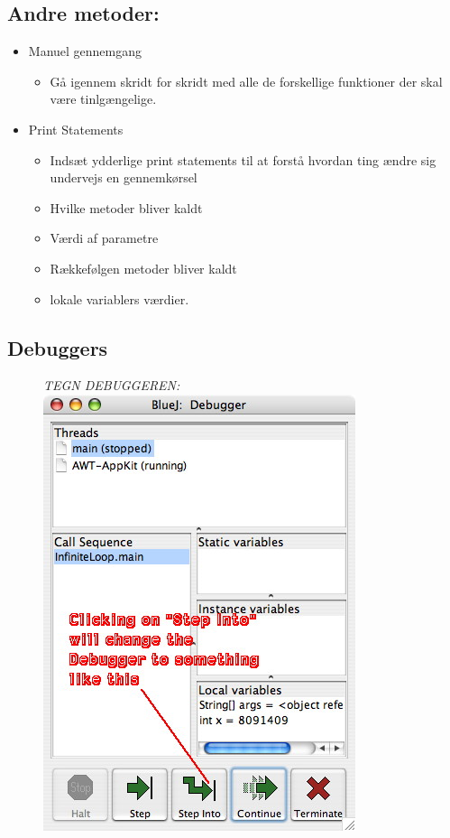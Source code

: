 \documentclass{article}
\begin{document}
\subsection*{Andre metoder:}
\begin{itemize}
    \item Manuel gennemgang
    \begin{itemize}
        \item Gå igennem skridt for skridt med alle de forskellige funktioner der skal være tinlgængelige.
    \end{itemize}
    \item Print Statements
    \begin{itemize}
        \item Indsæt ydderlige print statements til at forstå hvordan ting ændre sig undervejs en gennemkørsel
        \item Hvilke metoder bliver kaldt
        \item Værdi af parametre
        \item Rækkefølgen metoder bliver kaldt
        \item lokale variablers værdier.
    \end{itemize}
\end{itemize}

\subsection*{Debuggers}
\begin{figure}[H]
    \centering
    \textit{TEGN DEBUGGEREN:} \\
    \includegraphics[scale=0.4]{img/loopInfin_debuggerStepInto.jpg}
\end{figure}
\end{document}
